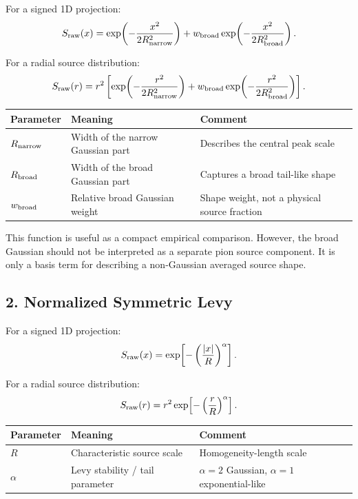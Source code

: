 \documentclass[11pt]{article}
\begin{document}
For a signed 1D projection:
\begin{equation}
  S_{\rm raw}(x)
  =
  \exp\!\left(-\frac{x^2}{2R_{\rm narrow}^2}\right)
  +
  w_{\rm broad}
  \exp\!\left(-\frac{x^2}{2R_{\rm broad}^2}\right).
\end{equation}

For a radial source distribution:
\begin{equation}
  S_{\rm raw}(r)
  =
  r^2
  \left[
  \exp\!\left(-\frac{r^2}{2R_{\rm narrow}^2}\right)
  +
  w_{\rm broad}
  \exp\!\left(-\frac{r^2}{2R_{\rm broad}^2}\right)
  \right].
\end{equation}

\begin{center}
\begin{tabular}{lll}
\toprule
Parameter & Meaning & Comment \\
\midrule
\(R_{\rm narrow}\) & Width of the narrow Gaussian part & Describes the central peak scale \\
\(R_{\rm broad}\) & Width of the broad Gaussian part & Captures a broad tail-like shape \\
\(w_{\rm broad}\) & Relative broad Gaussian weight & Shape weight, not a physical source fraction \\
\bottomrule
\end{tabular}
\end{center}

This function is useful as a compact empirical comparison. However, the broad
Gaussian should not be interpreted as a separate pion source component. It is
only a basis term for describing a non-Gaussian averaged source shape.

\subsection*{2. Normalized Symmetric Levy}

For a signed 1D projection:
\begin{equation}
  S_{\rm raw}(x)
  =
  \exp\!\left[-\left(\frac{|x|}{R}\right)^\alpha\right].
\end{equation}

For a radial source distribution:
\begin{equation}
  S_{\rm raw}(r)
  =
  r^2
  \exp\!\left[-\left(\frac{r}{R}\right)^\alpha\right].
\end{equation}

\begin{center}
\begin{tabular}{lll}
\toprule
Parameter & Meaning & Comment \\
\midrule
\(R\) & Characteristic source scale & Homogeneity-length scale \\
\(\alpha\) & Levy stability / tail parameter & \(\alpha=2\) Gaussian, \(\alpha=1\) exponential-like \\
\bottomrule
\end{tabular}
\end{center}
\end{document}
